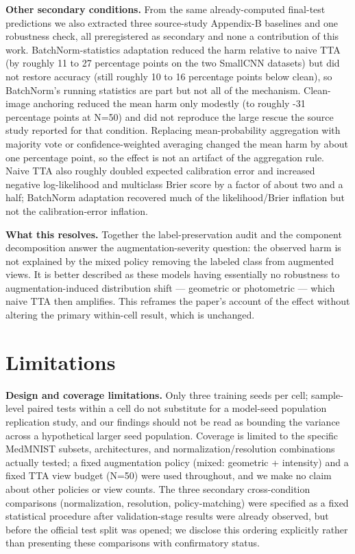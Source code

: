 \textbf{Other secondary conditions.} From the same already-computed final-test predictions we also extracted three source-study Appendix-B baselines and one robustness check, all preregistered as secondary and none a contribution of this work. BatchNorm-statistics adaptation reduced the harm relative to naive TTA (by roughly 11 to 27 percentage points on the two SmallCNN datasets) but did not restore accuracy (still roughly 10 to 16 percentage points below clean), so BatchNorm's running statistics are part but not all of the mechanism. Clean-image anchoring reduced the mean harm only modestly (to roughly -31 percentage points at N=50) and did not reproduce the large rescue the source study reported for that condition. Replacing mean-probability aggregation with majority vote or confidence-weighted averaging changed the mean harm by about one percentage point, so the effect is not an artifact of the aggregation rule. Naive TTA also roughly doubled expected calibration error and increased negative log-likelihood and multiclass Brier score by a factor of about two and a half; BatchNorm adaptation recovered much of the likelihood/Brier inflation but not the calibration-error inflation.

\textbf{What this resolves.} Together the label-preservation audit and the component decomposition answer the augmentation-severity question: the observed harm is not explained by the mixed policy removing the labeled class from augmented views. It is better described as these models having essentially no robustness to augmentation-induced distribution shift --- geometric or photometric --- which naive TTA then amplifies. This reframes the paper's account of the effect without altering the primary within-cell result, which is unchanged.

\section{Limitations}

\textbf{Design and coverage limitations.} Only three training seeds per cell; sample-level paired tests within a cell do not substitute for a model-seed population replication study, and our findings should not be read as bounding the variance across a hypothetical larger seed population. Coverage is limited to the specific MedMNIST subsets, architectures, and normalization/resolution combinations actually tested; a fixed augmentation policy (mixed: geometric + intensity) and a fixed TTA view budget (N=50) were used throughout, and we make no claim about other policies or view counts. The three secondary cross-condition comparisons (normalization, resolution, policy-matching) were specified as a fixed statistical procedure after validation-stage results were already observed, but before the official test split was opened; we disclose this ordering explicitly rather than presenting these comparisons with confirmatory status.

